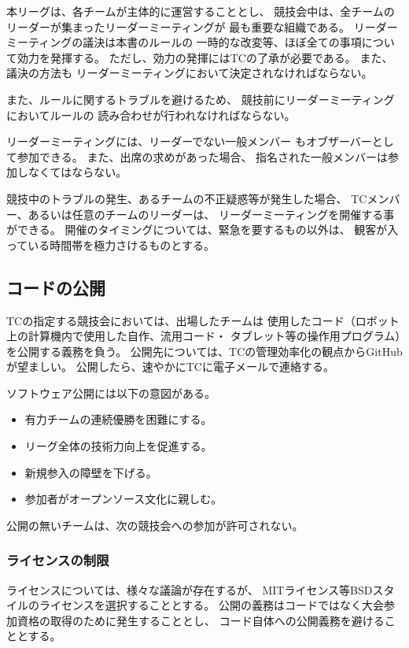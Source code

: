 \documentclass[a4j]{jarticle}
\begin{document}
本リーグは、各チームが主体的に運営することとし、
競技会中は、全チームのリーダーが集まったリーダーミーティングが
最も重要な組織である。
リーダーミーティングの議決は本書のルールの
一時的な改変等、ほぼ全ての事項について効力を発揮する。
ただし、効力の発揮にはTCの了承が必要である。
また、議決の方法も
リーダーミーティングにおいて決定されなければならない。

また、ルールに関するトラブルを避けるため、
競技前にリーダーミーティングにおいてルールの
読み合わせが行われなければならない。


リーダーミーティングには、リーダーでない一般メンバー
もオブザーバーとして参加できる。
また、出席の求めがあった場合、
指名された一般メンバーは参加しなくてはならない。


競技中のトラブルの発生、あるチームの不正疑惑等が発生した場合、
TCメンバー、あるいは任意のチームのリーダーは、
リーダーミーティングを開催する事ができる。
開催のタイミングについては、緊急を要するもの以外は、
観客が入っている時間帯を極力さけるものとする。

\subsection{コードの公開}

TCの指定する競技会においては、出場したチームは
使用したコード（ロボット上の計算機内で使用した自作、流用コード・
タブレット等の操作用プログラム）を公開する義務を負う。
公開先については、TCの管理効率化の観点からGitHubが望ましい。
公開したら、速やかにTCに電子メールで連絡する。


ソフトウェア公開には以下の意図がある。
\begin{itemize}
	\item 有力チームの連続優勝を困難にする。
	\item リーグ全体の技術力向上を促進する。
	\item 新規参入の障壁を下げる。
	\item 参加者がオープンソース文化に親しむ。
\end{itemize}
公開の無いチームは、次の競技会への参加が許可されない。

\subsubsection{ライセンスの制限}

ライセンスについては、様々な議論が存在するが、
MITライセンス等BSDスタイルのライセンスを選択することとする。
公開の義務はコードではなく大会参加資格の取得のために発生することとし、
コード自体への公開義務を避けることとする。
\end{document}
